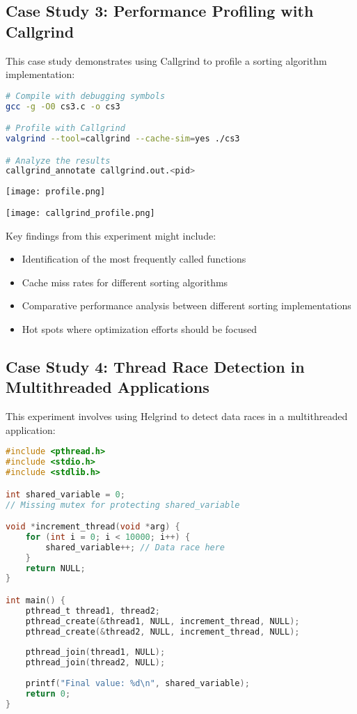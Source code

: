 \documentclass[11pt,a4paper]{article}
\begin{document}
\subsection{Case Study 3: Performance Profiling with Callgrind}


This case study demonstrates using Callgrind to profile a sorting algorithm implementation:

\begin{lstlisting}[caption=Profiling with Callgrind, language=bash]
# Compile with debugging symbols
gcc -g -O0 cs3.c -o cs3

# Profile with Callgrind
valgrind --tool=callgrind --cache-sim=yes ./cs3

# Analyze the results
callgrind_annotate callgrind.out.<pid>
\end{lstlisting}

\begin{center}
        \texttt{[image: profile.png]}

\end{center}    \begin{center}
          \texttt{[image: callgrind\_profile.png]}
  
    \end{center}


Key findings from this experiment might include:
\begin{itemize}
    \item Identification of the most frequently called functions
    \item Cache miss rates for different sorting algorithms
    \item Comparative performance analysis between different sorting implementations
    \item Hot spots where optimization efforts should be focused
\end{itemize}
\subsection{Case Study 4: Thread Race Detection in Multithreaded Applications}

This experiment involves using Helgrind to detect data races in a multithreaded application:

\begin{lstlisting}[caption=Multithreaded program with data race, language=C]
#include <pthread.h>
#include <stdio.h>
#include <stdlib.h>

int shared_variable = 0;
// Missing mutex for protecting shared_variable

void *increment_thread(void *arg) {
    for (int i = 0; i < 10000; i++) {
        shared_variable++; // Data race here
    }
    return NULL;
}

int main() {
    pthread_t thread1, thread2;
    pthread_create(&thread1, NULL, increment_thread, NULL);
    pthread_create(&thread2, NULL, increment_thread, NULL);
    
    pthread_join(thread1, NULL);
    pthread_join(thread2, NULL);
    
    printf("Final value: %d\n", shared_variable);
    return 0;
}
\end{lstlisting}
\end{document}
